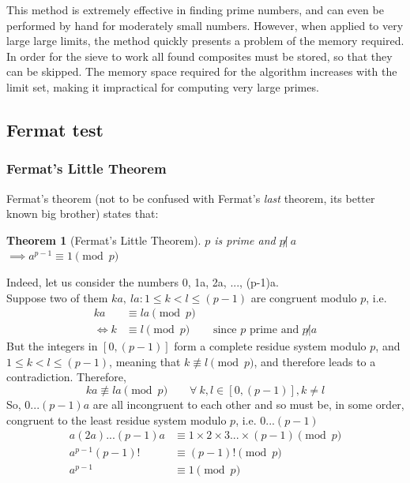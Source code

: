 \documentclass[12pt, titlepage]{article}
\newtheorem{theorem}{Theorem}
\begin{document}
%
This method is extremely effective in finding prime numbers, and can even be performed
by hand for moderately small numbers. However, when applied to very large large limits,
the method quickly presents a problem of the memory required. In order for the sieve to
work all found composites must be stored, so that they can be skipped. The memory space
required for the algorithm increases with the limit set, making it impractical for
computing very large primes.
       
\subsection{Fermat test} \label{sec:fermat}

\subsubsection{Fermat's Little Theorem}

Fermat's theorem (not to be confused with Fermat's \emph{last} theorem, its better known big
brother) states that: \autocite{dence}
%
\begin{theorem}[Fermat's Little Theorem]
    $p$ is prime and $p \not|\ a$ $\implies a^{p-1} \equiv 1 \pmod{p}$
\end{theorem}
%
Indeed, let us consider the numbers 0, 1a, 2a, ..., (p-1)a.\\
Suppose two of them $ka,\ la: 1\leq k < l \leq (p-1)$ are congruent modulo $p$, i.e.
%
\begin{align*}
          ka &\equiv la \pmod{p}\\
    \iff  k  &\equiv l  \pmod{p} &&\text{since $p$ prime and $p \not| a$}
\end{align*}
%
But the integers in $[0, (p-1)]$ form a complete residue system modulo $p$, and  $1
\leq k<l \leq (p-1)$, meaning that $k \not\equiv l \pmod p$, and therefore leads to a
contradiction. Therefore,
%
\begin{equation*}
    ka \not\equiv la \pmod{p}\qquad \forall\ k,l \in [0, (p-1)], k \not= l
\end{equation*}
%
So, $0...(p-1)a$ are all incongruent to each other and so must be, in some order,
congruent to the least residue system modulo $p$, i.e.  $0...(p-1)$
%
\begin{align*}
    a(2a)...(p-1)a &\equiv 1\times 2\times 3...\times (p-1) \pmod{p}\\
    a^{p-1}(p-1)!  &\equiv (p-1)!                           \pmod{p}\\
    a^{p-1}        &\equiv 1                                \pmod{p}
\end{align*}
%
\end{document}
